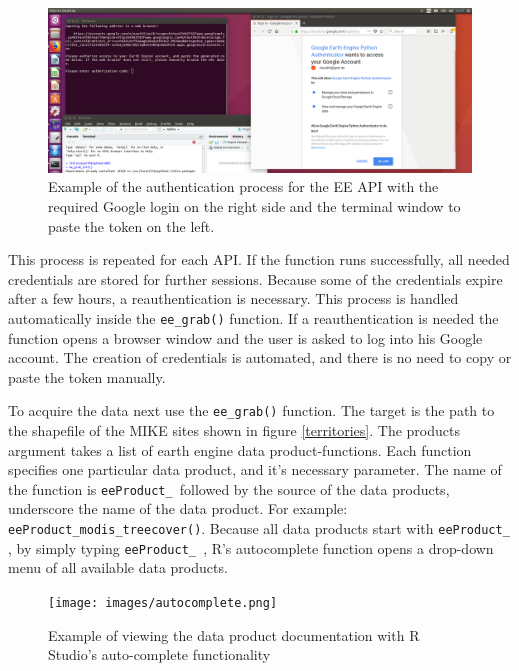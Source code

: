 \begin{center}
	\begin{figure}[h]
		\begin{center}
			\includegraphics[width=15cm]{images/install_authentication.png}
			\caption{Example of the authentication process for the EE API with the required Google login on the right side and the terminal window to paste the token on the left.}
			\label{install}
		\end{center}
	\end{figure}
\end{center}



This process is repeated for each API. If the function runs successfully, all needed credentials are stored for further sessions. Because some of the credentials expire after a few hours, a reauthentication is necessary. This process is handled automatically inside the \texttt{ee\_grab()} function. If a reauthentication is needed the function opens a browser window and the user is asked to log into his Google account. The creation of credentials is automated, and there is no need to copy or paste the token manually.

To acquire the data next use the \texttt{ee\_grab()} function. The target is the path to the shapefile of the MIKE sites shown in figure \ref{territories}. The products argument takes a list of earth engine data product-functions. Each function specifies one particular data product, and it's necessary parameter. The name of the function is \texttt{eeProduct\_ }followed by the source of the data products, underscore the name of the data product. For example: \texttt{eeProduct\_modis\_treecover()}. Because all data products start with \texttt{eeProduct\_ }, by simply typing \texttt{eeProduct\_ }, R's autocomplete function opens a drop-down menu of all available data products. 

\begin{center}
	\begin{figure}[h]
		\begin{center}
			\texttt{[image: images/autocomplete.png]}
			\caption{Example of viewing the data product documentation with R Studio's auto-complete functionality}
			\label{install}
		\end{center}
	\end{figure}
\end{center}




